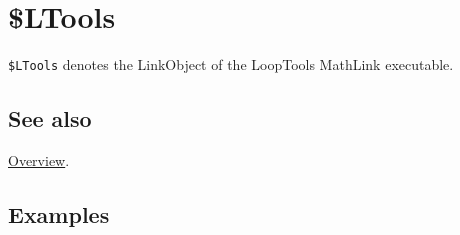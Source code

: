 \documentclass[../FeynHelpersManual.tex]{subfiles}
\begin{document}
\hypertarget{dollarltools}{
\section{\$LTools}\label{dollarltools}}

\texttt{\$LTools} denotes the LinkObject of the LoopTools MathLink
executable.

\subsection{See also}

\hyperlink{toc}{Overview}.

\subsection{Examples}
\end{document}
